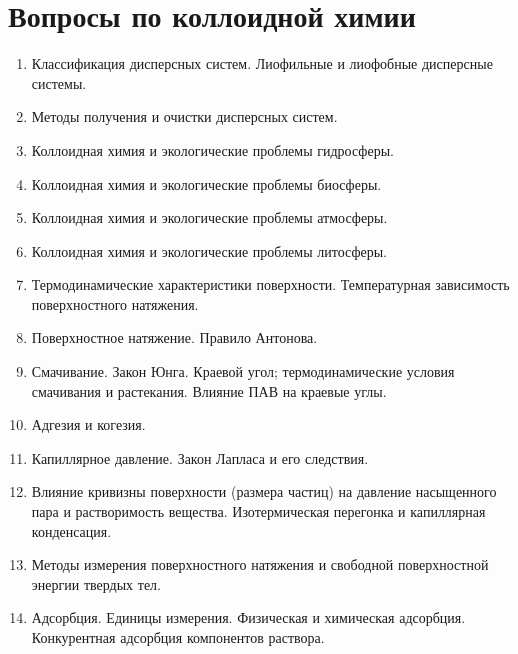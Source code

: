\section{Вопросы по коллоидной химии}
\begin{enumerate}
\item 
Классификация  дисперсных систем. Лиофильные и лиофобные дисперсные системы. 
 
\item 
Методы получения и очистки дисперсных систем.
 
\item 
Коллоидная химия и экологические проблемы гидросферы.
 
\item 
Коллоидная химия и экологические проблемы биосферы.
 
\item 
Коллоидная химия и экологические проблемы атмосферы.
 
\item 
Коллоидная химия и экологические проблемы литосферы.
 
%
\item 
Термодинамические характеристики поверхности. Температурная зависимость поверхностного натяжения.
 
\item 
Поверхностное натяжение. Правило Антонова.
 
\item 
Смачивание. Закон Юнга. Краевой угол; термодинамические условия смачивания и растекания. Влияние ПАВ на краевые углы.
 
\item 
Адгезия и когезия.
 
\item 
Капиллярное давление. Закон Лапласа и его следствия.
 
\item 
Влияние кривизны поверхности (размера частиц) на давление насыщенного пара и растворимость вещества. Изотермическая перегонка и капиллярная конденсация.
 
\item 
Методы измерения поверхностного натяжения и свободной поверхностной энергии твердых тел.
 
%
\item 
Адсорбция. Единицы измерения. Физическая и химическая адсорбция. Конкурентная адсорбция компонентов раствора.
 

\end{enumerate}
